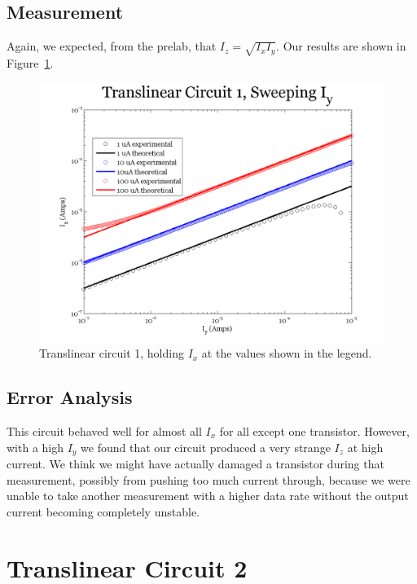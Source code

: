 \documentclass{article}
\begin{document}
\subsection*{Measurement}


Again, we expected, from the prelab, that $I_z = \sqrt{I_xI_y}$.  Our results are shown in Figure~\ref{fig:exp2sweepy}.

\begin{figure}[H]
\begin{center}
\includegraphics[scale=.75]{exp2_sweepy.png}
\caption{Translinear circuit 1, holding $I_x$ at the values shown in the legend.}
\label{fig:exp2sweepy}
\end{center}
\end{figure}

\subsection*{Error Analysis}

This circuit behaved well for almost all $I_x$ for all except one transistor.  However, with a high $I_y$ we found that our circuit produced a very strange $I_z$ at high current.  We think we might have actually damaged a transistor during that measurement, possibly from pushing too much current through,  because we were unable to take another measurement with a higher data rate without the output current becoming completely unstable.

\section*{Translinear Circuit 2}
\end{document}
